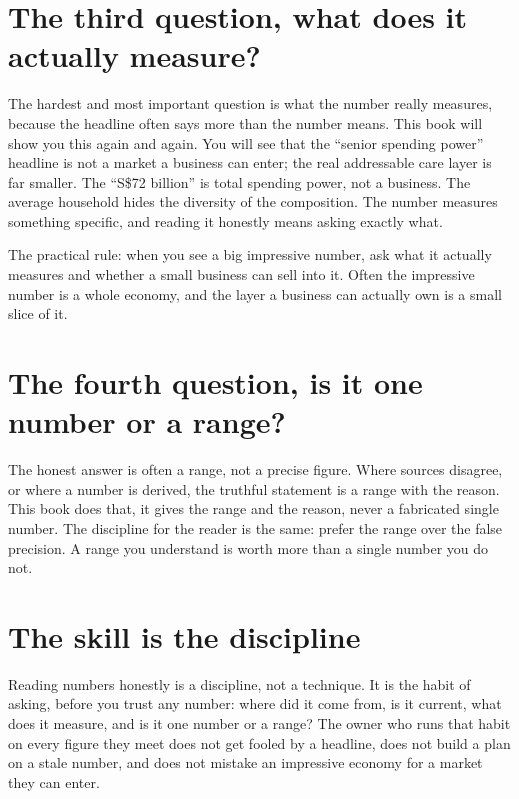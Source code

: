 \documentclass[10pt,twoside,openany]{memoir}
\newcommand{\needspacehead}{\needspace{4\baselineskip}}
\let\oldsection\section
\renewcommand{\section}{\needspacehead\oldsection}
\begin{document}
\section{The third question, what does it actually
measure?}\label{the-third-question-what-does-it-actually-measure}

The hardest and most important question is what the number really
measures, because the headline often says more than the number means.
This book will show you this again and again. You will see that the
``senior spending power'' headline is not a market a business can enter;
the real addressable care layer is far smaller. The ``S\$72 billion'' is
total spending power, not a business. The average household hides the
diversity of the composition. The number measures something specific,
and reading it honestly means asking exactly what.

The practical rule: when you see a big impressive number, ask what it
actually measures and whether a small business can sell into it. Often
the impressive number is a whole economy, and the layer a business can
actually own is a small slice of it.

\section{The fourth question, is it one number or a
range?}\label{the-fourth-question-is-it-one-number-or-a-range}

The honest answer is often a range, not a precise figure. Where sources
disagree, or where a number is derived, the truthful statement is a
range with the reason. This book does that, it gives the range and the
reason, never a fabricated single number. The discipline for the reader
is the same: prefer the range over the false precision. A range you
understand is worth more than a single number you do not.

\section{The skill is the discipline}\label{the-skill-is-the-discipline}

Reading numbers honestly is a discipline, not a technique. It is the
habit of asking, before you trust any number: where did it come from, is
it current, what does it measure, and is it one number or a range? The
owner who runs that habit on every figure they meet does not get fooled
by a headline, does not build a plan on a stale number, and does not
mistake an impressive economy for a market they can enter.
\end{document}
